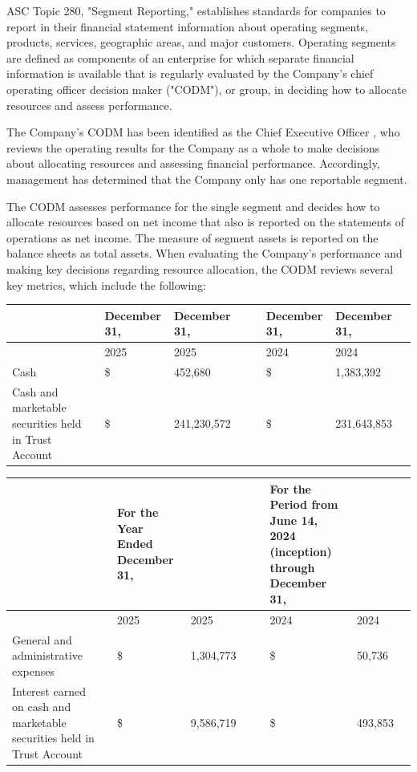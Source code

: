 \documentclass[11pt,a4paper]{article}
\begin{document}
ASC Topic 280, "Segment Reporting," establishes standards for companies to report in their financial statement information about operating segments, products, services, geographic areas, and major customers. Operating segments are defined as components of an enterprise for which separate financial information is available that is regularly evaluated by the Company's chief operating officer decision maker ("CODM"), or group, in deciding how to allocate resources and assess performance.

The Company's CODM has been identified as the Chief Executive Officer , who reviews the operating results for the Company as a whole to make decisions about allocating resources and assessing financial performance. Accordingly, management has determined that the Company only has one reportable segment.

The CODM assesses performance for the single segment and decides how to allocate resources based on net income that also is reported on the statements of operations as net income. The measure of segment assets is reported on the balance sheets as total assets. When evaluating the Company's performance and making key decisions regarding resource allocation, the CODM reviews several key metrics, which include the following:

\begin{table}[h]
\begin{tabular}{|l|l|l|l|l|l|l|l|l|}
\hline
 &  & December 31, & December 31, &  &  & December 31, & December 31, &  \\ \hline
 &  & 2025 & 2025 &  &  & 2024 & 2024 &  \\ \hline
Cash &  & \$ & 452,680 &  &  & \$ & 1,383,392 &  \\ \hline
Cash and marketable securities held in Trust Account &  & \$ & 241,230,572 &  &  & \$ & 231,643,853 &  \\ \hline
\end{tabular}
\end{table}

\begin{table}[h]
\begin{tabular}{|l|l|l|l|l|l|l|l|l|}
\hline
 &  & For the Year Ended December 31, &  &  &  & For the Period from June 14, 2024 (inception) through December 31, &  &  \\ \hline
 &  & 2025 & 2025 &  &  & 2024 & 2024 &  \\ \hline
General and administrative expenses &  & \$ & 1,304,773 &  &  & \$ & 50,736 &  \\ \hline
Interest earned on cash and marketable securities held in Trust Account &  & \$ & 9,586,719 &  &  & \$ & 493,853 &  \\ \hline
\end{tabular}
\end{table}
\end{document}
